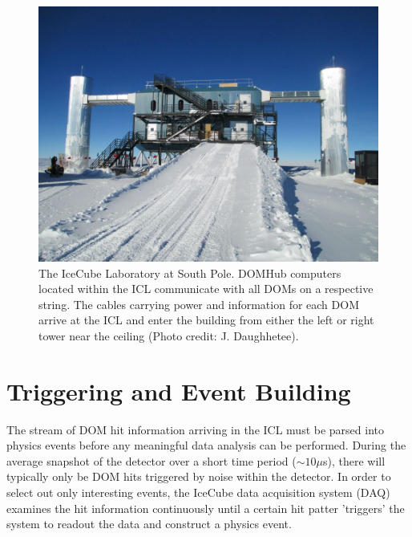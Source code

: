 \documentclass{gatech-thesis}
\begin{document}
\begin{figure}[ht]
  \begin{center}
    \includegraphics[width=1.0\textwidth,keepaspectratio]{ICL.jpg}
  \end{center}
  \caption{The IceCube Laboratory at South Pole. DOMHub computers located within the ICL communicate with all DOMs on a respective string. The cables carrying power and information for each DOM arrive at the ICL and enter the building from either the left or right tower near the ceiling (Photo credit: J. Daughhetee).}
  \label{fig:icl}
\end{figure}

\section{Triggering and Event Building}

The stream of DOM hit information arriving in the ICL must be parsed into physics events before any meaningful data analysis can be performed. During the average snapshot of the detector over a short time period ($\sim 10 \mu$s), there will typically only be DOM hits triggered by noise within the detector. In order to select out only interesting events, the IceCube data acquisition system (DAQ) examines the hit information continuously until a certain hit patter 'triggers' the system to readout the data and construct a physics event.
\end{document}
